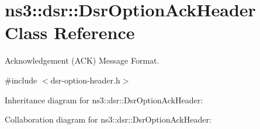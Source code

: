 \hypertarget{classns3_1_1dsr_1_1DsrOptionAckHeader}{}\section{ns3\+:\+:dsr\+:\+:Dsr\+Option\+Ack\+Header Class Reference}
\label{classns3_1_1dsr_1_1DsrOptionAckHeader}


Acknowledgement (A\+CK) Message Format.  




{\ttfamily \#include $<$dsr-\/option-\/header.\+h$>$}



Inheritance diagram for ns3\+:\+:dsr\+:\+:Dsr\+Option\+Ack\+Header\+:


Collaboration diagram for ns3\+:\+:dsr\+:\+:Dsr\+Option\+Ack\+Header\+:
